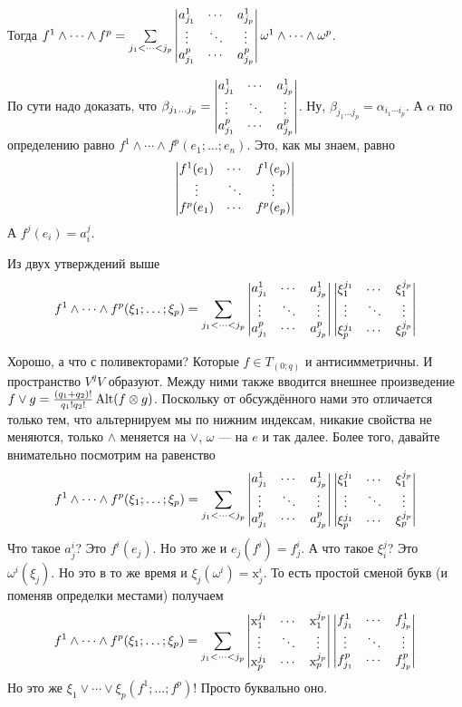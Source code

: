 \documentclass{article}
\begin{document}
\begin{itemize}
        Тогда $f^1\land\cdots\land f^p=\sum\limits_{j_1<\cdots<j_p}\left|\begin{matrix}a^1_{j_1}&\cdots&a^1_{j_p}\\\vdots&\ddots&\vdots\\a^p_{j_1}&\cdots&a^p_{j_p}\end{matrix}\right|\omega^1\land\cdots\land\omega^p$.
        \begin{Proof}
            По сути надо доказать, что $\beta_{j_1\ldots j_p}=\left|\begin{matrix}a^1_{j_1}&\cdots&a^1_{j_p}\\\vdots&\ddots&\vdots\\a^p_{j_1}&\cdots&a^p_{j_p}\end{matrix}\right|$. Ну, $\beta_{j_1\ldots j_p}=\alpha_{i_1\cdots i_p}$. А $\alpha$ по определению равно $f^1\land\cdots\land f^p(e_1;\ldots;e_n)$. Это, как мы знаем, равно
            $$\left|\begin{matrix}f^1(e_1)&\cdots&f^1(e_p)\\\vdots&\ddots&\vdots\\f^p(e_1)&\cdots&f^p(e_p)\end{matrix}\right|$$
            А $f^j(e_i)=a^j_i$.
        \end{Proof}
        \thm Из двух утверждений выше
        $$f^1\land\cdots\land f^p(\xi_1;\ldots;\xi_p)=\sum\limits_{j_1<\cdots<j_p}\left|\begin{matrix}a^1_{j_1}&\cdots&a^1_{j_p}\\\vdots&\ddots&\vdots\\a^p_{j_1}&\cdots&a^p_{j_p}\end{matrix}\right|\left|\begin{matrix}\xi_1^{j_1}&\cdots&\xi_1^{j_p}\\\vdots&\ddots&\vdots\\\xi_p^{j_1}&\cdots&\xi_p^{j_p}\end{matrix}\right|$$
        \begin{Comment}
            Хорошо, а что с поливекторами? Которые $f\in T_{(0;q)}$ и антисимметричны. И пространство $V^qV$ образуют. Между ними также вводится внешнее произведение $f\lor g=\frac{(q_1+q_2)!}{q_1!q_2!}\operatorname{Alt}(f\otimes g)$. Поскольку от обсуждённого нами это отличается только тем, что альтернируем мы по нижним индексам, никакие свойства не меняются, только $\land$ меняется на $\lor$, $\omega$ --- на $e$ и так далее. Более того, давайте внимательно посмотрим на равенство $$f^1\land\cdots\land f^p(\xi_1;\ldots;\xi_p)=\sum\limits_{j_1<\cdots<j_p}\left|\begin{matrix}a^1_{j_1}&\cdots&a^1_{j_p}\\\vdots&\ddots&\vdots\\a^p_{j_1}&\cdots&a^p_{j_p}\end{matrix}\right|\left|\begin{matrix}\xi_1^{j_1}&\cdots&\xi_1^{j_p}\\\vdots&\ddots&\vdots\\\xi_p^{j_1}&\cdots&\xi_p^{j_p}\end{matrix}\right|$$
            Что такое $a_j^i$? Это $f^i(e_j)$. Но это же и $e_j(f^i)=f^i_j$. А что такое $\xi_i^j$? Это $\omega^i(\xi_j)$. Но это в то же время и $\xi_j(\omega^i)=\mathrm x_j^i$. То есть простой сменой букв (и поменяв определки местами) получаем
            $$f^1\land\cdots\land f^p(\xi_1;\ldots;\xi_p)=\sum\limits_{j_1<\cdots<j_p}\left|\begin{matrix}\mathrm x_1^{j_1}&\cdots&\mathrm x_1^{j_p}\\\vdots&\ddots&\vdots\\\mathrm x_p^{j_1}&\cdots&\mathrm x_p^{j_p}\end{matrix}\right|\left|\begin{matrix}f^1_{j_1}&\cdots&f^1_{j_p}\\\vdots&\ddots&\vdots\\f^p_{j_1}&\cdots&f^p_{j_p}\end{matrix}\right|$$
            Но это же $\xi_1\lor\cdots\lor\xi_p(f^1;\ldots;f^p)$! Просто буквально оно.
        \end{Comment}
    \end{itemize}
\end{document}
